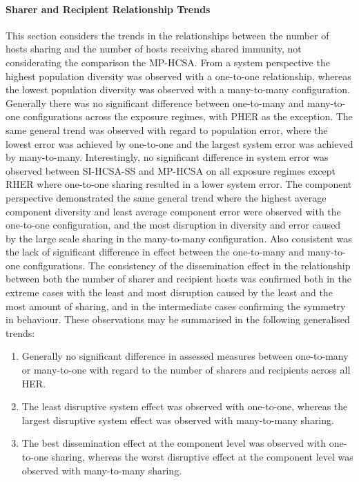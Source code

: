 \paragraph{Sharer and Recipient Relationship Trends}
This section considers the trends in the relationships between the number of hosts sharing and the number of hosts receiving shared immunity, not considerating the comparison the MP-HCSA. 
From a system perspective the highest population diversity was observed with a one-to-one relationship, whereas the lowest population diversity was observed with a many-to-many configuration. Generally there was no significant difference between one-to-many and many-to-one configurations across the exposure regimes, with PHER as the exception. The same general trend was observed with regard to population error, where the lowest error was achieved by one-to-one and the largest system error was achieved by many-to-many. Interestingly, no significant difference in system error was observed between SI-HCSA-SS and MP-HCSA on all exposure regimes except RHER where one-to-one sharing resulted in a lower system error.
The component perspective demonstrated the same general trend where the highest average component diversity and least average component error were observed with the one-to-one configuration, and the most disruption in diversity and error caused by the large scale sharing in the many-to-many configuration. Also consistent was the lack of significant difference in effect between the one-to-many and many-to-one configurations. 
The consistency of the dissemination effect in the relationship between both the number of sharer and recipient hosts was confirmed both in the extreme cases with the least and most disruption caused by the least and the most amount of sharing, and in the intermediate cases confirming the symmetry in behaviour. These observations may be summarised in the following generalised trends:

\begin{enumerate}
	\item Generally no significant difference in assessed measures between one-to-many or many-to-one with regard to the number of sharers and recipients across all HER.
	\item The least disruptive system effect was observed with one-to-one, whereas the largest disruptive system effect was observed with many-to-many sharing.
	\item The best dissemination effect at the component level was observed with one-to-one sharing, whereas the worst disruptive effect at the component level was observed with many-to-many sharing.
\end{enumerate}


